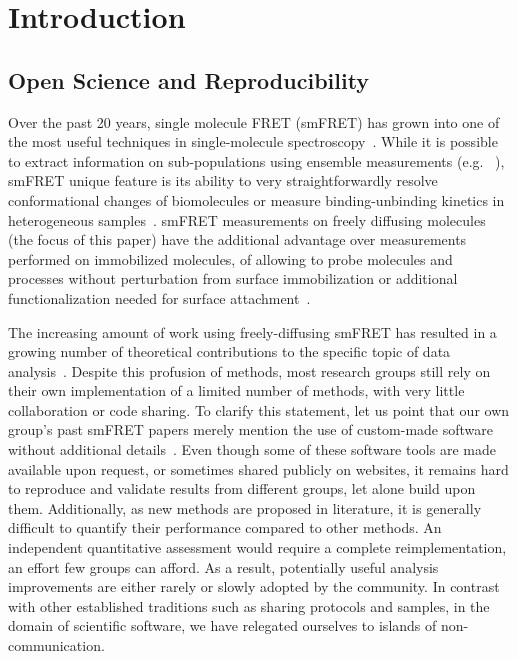 \section{Introduction}

\subsection{Open Science and Reproducibility}

Over the past 20 years, single molecule FRET (smFRET) has grown into one of the most
useful techniques in single-molecule spectroscopy~\cite{Weiss_1999,Hohlbein_2014}.
While it is possible to extract information on sub-populations using ensemble measurements 
(e.g. ~\cite{Lerner_2014,Rahamim_2015}),
smFRET unique feature is its ability to very straightforwardly resolve conformational
changes of biomolecules or measure binding-unbinding kinetics in heterogeneous 
samples~\cite{Selvin_2000,Roy_2008}.
smFRET measurements on freely diffusing molecules (the focus of this paper) 
have the additional advantage over measurements performed on immobilized molecules, 
of allowing to probe molecules and processes without perturbation from surface
immobilization or additional functionalization needed for surface 
attachment~\cite{Eggeling_1998,Dahan_1999}.

The increasing amount of work using freely-diffusing smFRET has resulted 
in a growing number of theoretical contributions to the specific topic of data 
analysis~\cite{Fries_1998,Eggeling_2001,Zhang_2005,Gopich_2005,Lee_2005,Nir_2006,Antonik2006,Gopich_2007,Gopich_2008,Camley_2009,Santoso_2010,Torella_2011,Tomov_2012}. 
Despite this profusion of methods, most research groups still rely on 
their own implementation of a limited number of methods, with very little 
collaboration or code sharing. 
To clarify this statement, let us point that our own group's past smFRET papers 
merely mention the use of custom-made software without additional details~\cite{Lee_2005,Nir_2006}. 
Even though some of these software tools are made available upon request, 
or sometimes shared publicly on websites, 
it remains hard to reproduce and validate results from different groups, 
let alone build upon them.
Additionally, as new methods are proposed in literature,
it is generally difficult to quantify their performance compared to other methods.
An independent quantitative assessment
would require a complete reimplementation, an effort few groups can afford.
As a result, potentially useful analysis improvements
are either rarely or slowly adopted by the community.
In contrast with other established traditions such as
sharing protocols and samples, in the domain of scientific software,
we have relegated ourselves to islands of non-communication.


